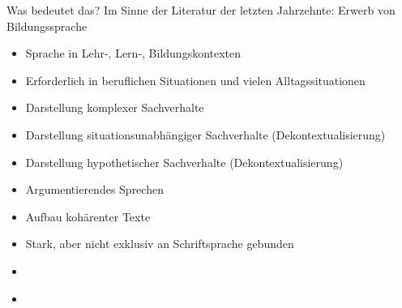\begin{frame}
  {Was bedeutet das?}
  \onslide<+->
  \onslide<+->
  Im Sinne der Literatur der letzten Jahrzehnte: Erwerb von \alert{Bildungssprache}\\
  \Zeile
  \begin{itemize}[<+->]
    \item Sprache in \alert{Lehr-, Lern-, Bildungskontexten}
    \item Erforderlich in \alert{beruflichen Situationen} und \alert{vielen Alltagssituationen}
    \item Darstellung \alert{komplexer Sachverhalte}
    \item Darstellung \alert{situationsunabhängiger Sachverhalte} (Dekontextualisierung)
    \item Darstellung \alert{hypothetischer Sachverhalte} (Dekontextualisierung)
    \item \alert{Argumentierendes Sprechen}
    \item Aufbau \alert{kohärenter Texte}
    \item Stark, aber nicht exklusiv an \alert{Schriftsprache} gebunden
    \item {}\\
    \item {}\\
  \end{itemize}
\end{frame}

